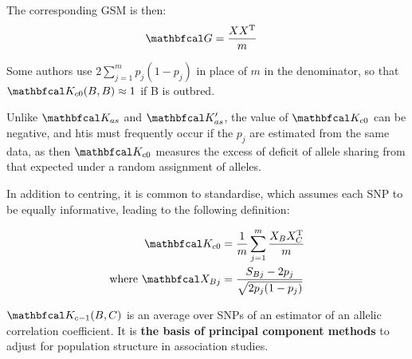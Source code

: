 \documentclass[document.tex]{subfiles}
\begin{document}
The corresponding GSM is then: 
\begin{equation}
    \begin{split}
        \mat{G} & = \frac{XX^\text{T}}{m}
    \end{split}
\end{equation}

Some authors use $2\sum\limits_{j=1}^m p_j(1-p_j)$ in place of $m$ in the 
denominator, so that $\mat{K}_{c0}(B,B) \approx 1$ if B is outbred.

Unlike $\mat{K}_{as}$ and $\mat{K}_{as}'$, the value of $\mat{K}_{c0}$
can be negative, and htis must frequently occur if the $p_j$ are estimated 
from the same data, as then $\mat{K}_{c0}$ measures the excess of 
deficit of allele sharing from that expected under a random assignment 
of alleles.

In addition to centring, it is common to standardise, which assumes 
each SNP to be equally informative, leading to the following 
definition:

\begin{equation}
    \begin{split}
        \mat{K}_{c0}               & = \frac{1}{m} \sum\limits_{j=1}^{m} \frac{X_BX_C^\text{T}}{m} \\
        \text{where } \mat{X}_{Bj} & = \frac{S_{Bj} - 2p_j}{\sqrt{2p_j(1-p_j)}}
    \end{split}
\end{equation}


$\mat{K}_{c-1}(B,C)$ is an average over SNPs of an estimator of an 
allelic correlation coefficient. It is 
\textbf{the basis of principal component methods} 
to adjust for population structure in association studies.

%
%
%
\end{document}
